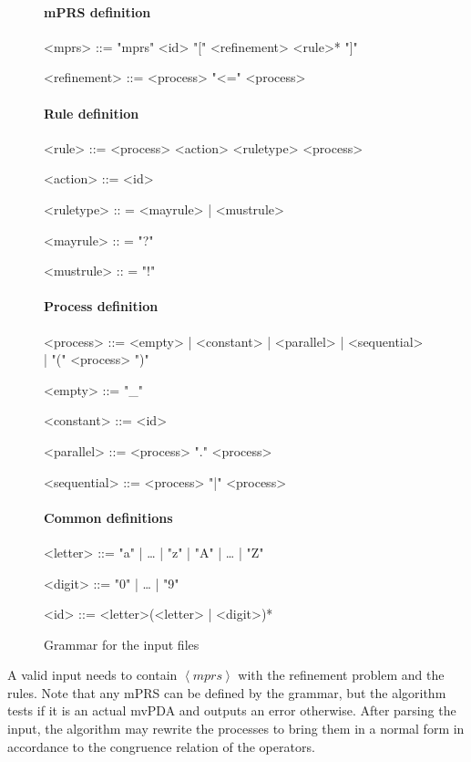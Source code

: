 \begin{figure}
\paragraph{mPRS definition}
\begin{grammar}
<mprs> ::= "mprs" <id> "[" <refinement> <rule>* "]"

<refinement> ::= <process> "<=" <process>

\end{grammar}

\paragraph{Rule definition}
\begin{grammar}
<rule> ::= <process> <action> <ruletype> <process>

<action> ::= <id>

<ruletype> :: = <mayrule> | <mustrule>

<mayrule> :: = "?"

<mustrule> :: = "!"
\end{grammar}

\paragraph{Process definition}
\begin{grammar}
<process> ::= <empty> | <constant> | <parallel> | <sequential> | "(" <process> ")"

<empty> ::= "_"

<constant> ::= <id>

<parallel> ::= <process> "." <process>

<sequential> ::= <process> "|" <process>
\end{grammar}

\paragraph{Common definitions}
\begin{grammar}
<letter> ::= "a" | … | "z" | "A" | … | "Z"

<digit> ::= "0" | …  | "9"

<id> ::= <letter>(<letter> | <digit>)*
\end{grammar}
\caption{Grammar for the input files}
\label{fig:grammar}
\end{figure}

A valid input needs to contain $\left< mprs \right>$ with the refinement problem and
the rules.
Note that any mPRS can be defined by the grammar, but the algorithm
tests if it is an actual mvPDA and outputs an error otherwise.
After parsing the input, the algorithm may rewrite the processes
to bring them in a normal form in accordance to the congruence relation
of the operators.

